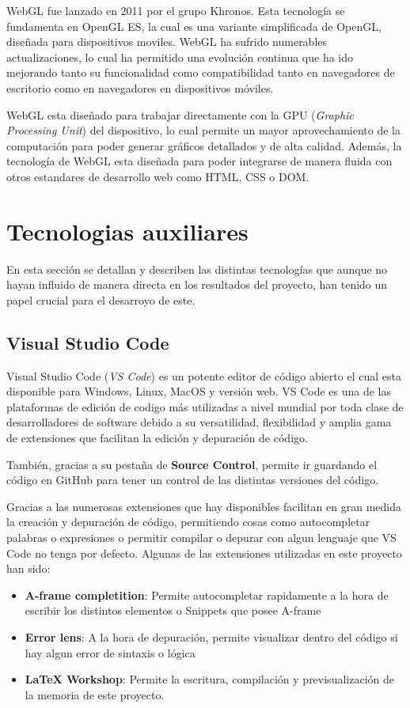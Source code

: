 \documentclass[a4paper, 12pt]{book}
\begin{document}
WebGL fue lanzado en 2011 por el grupo Khronos. Esta tecnología se fundamenta en OpenGL ES, la cual es una variante simplificada de OpenGL, diseñada para dispositivos moviles. WebGL ha sufrido numerables actualizaciones, 
lo cual ha permitido una evolución continua que ha ido mejorando tanto su funcionalidad como compatibilidad tanto en navegadores de escritorio como en navegadores en dispositivos móviles. 

WebGL esta diseñado para trabajar directamente con la GPU (\textit{Graphic Processing Unit}) del dispositivo, lo cual permite un mayor aprovechamiento de la computación para poder generar gráficos detallados y de alta calidad. 
Además, la tecnología de WebGL esta diseñada para poder integrarse de manera fluida con otros estandares de desarrollo web como HTML, CSS o DOM. 

\section{Tecnologias auxiliares}
\label{sec:tecnologias-auxiliares}
En esta sección se detallan y describen las distintas tecnologías que aunque no hayan influido de manera directa en los resultados del proyecto, han tenido un papel crucial para el desarroyo de este.


\subsection{Visual Studio Code}
\label{subsec: visualstudiocode}

Visual Studio Code (\textit{VS Code}) es un potente editor de código abierto el cual esta disponible para Windows, Linux, MacOS y versión web. VS Code es una de las plataformas de edición de codigo más utilizadas a nivel mundial 
por toda clase de desarrolladores de software debido a su versatilidad, flexibilidad y amplia gama de extensiones que facilitan la edición y depuración de código.

También, gracias a su pestaña de \textbf{Source Control}, permite ir guardando el código en GitHub para tener un control de las distintas versiones del código. 

Gracias a las numerosas extensiones que hay disponibles facilitan en gran medida la creación y depuración de código, permitiendo cosas como autocompletar palabras o expresiones o permitir compilar o depurar con algun lenguaje que VS Code no tenga por defecto.
Algunas de las extensiones utilizadas en este proyecto han sido: 
\begin{itemize}
  \item \textbf{A-frame completition}: Permite autocompletar rapidamente a la hora de escribir los distintos elementos o Snippets que posee A-frame
  \item \textbf{Error lens}: A la hora de depuración, permite visualizar dentro del código si hay algun error de sintaxis o lógica 
  \item \textbf{LaTeX Workshop}: Permite la escritura, compilación y previsualización de la memoria de este proyecto.
\end{itemize}
\end{document}
